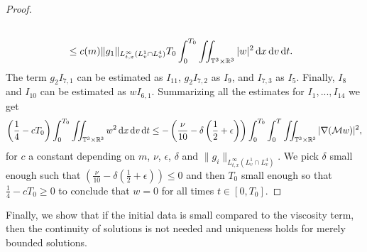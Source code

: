 \documentclass[11pt,american, reqno]{amsart}
\numberwithin{equation}{section}
\newcommand{\R}{\mathbb R}
\newcommand{\1}{\mathds{1}}
\newcommand{\dt}{\, {\rm d} t}
\newcommand{\dv}{\, {\rm d} v}
\newcommand{\dx}{\, {\rm d} x}
\newcommand{\CalM}{\mathcal{M}}
\newcommand{\Eps}{\epsilon}
\newcommand{\T}{\mathbb{T}}
\numberwithin{equation}{section}
\begin{document}
\begin{proof}
\begin{align*}
\\
&\le c(m) \|g_1\|_{L^\infty_{t,x}(L_v^1\cap L_v^4)} T_0 \int_0^{T_0}\iint_{\T^3 \times \R^3}  |w| ^2 \dx\dv\dt. 
\end{align*}
The term $g_2 I_{7,1}$ can be estimated as $I_{11}$, $g_2 I_{7,2}$ as $I_9$, and $I_{7,3}$ as $I_5$.  
Finally, $I_8$ and $I_{10}$ can be estimated as $w I_{6,1}$. Summarizing all the estimates for $I_1,...,I_{14}$ we get 
\begin{align*}
\left(\frac{1}{4}-cT_0\right) \int_0^{T_0} \iint_{\T^3 \times \R^3} w^2 \dx\dv\dt 
\le 
-\left(\frac{\nu}{10}-\delta\left(\frac{1}{2}+\Eps\right)\right) \int_0^{T_0}\int_0^{T} \iint_{\T^3 \times \R^3} |\nabla(\CalM w)|^2, %
\end{align*}
for $c$ a constant depending on $m$, $\nu$, $\Eps$, $\delta$ and $\|g_i\|_{L^\infty_{t,x}(L^1_v\cap L^4_v)}$. We pick $\delta$ small enough such that $\left(\frac{\nu}{10}-\delta\left(\frac{1}{2}+\Eps\right)\right)\le 0$ and then $T_0$ small enough so that $\frac{1}{4}-cT_0\ge 0$ to conclude that $w = 0$ for all times $t\in [0,T_0]$. 
\end{proof}

Finally, we show that if the initial data is small compared to the viscosity term, then the continuity of solutions is not needed and uniqueness holds for merely bounded solutions. 
\end{document}
